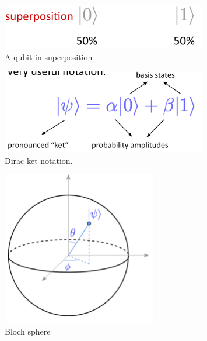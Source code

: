 \begin{figure}[H]
    \centering
    \includegraphics[width=0.8\textwidth]{lesson2/superposition_qubit.pdf}
    
        \caption{A qubit in superposition}
    
    \label{fig:superpos}
\end{figure}
\fi

\begin{figure}[H]
    \centering
    \includegraphics[width=0.8\textwidth]{lesson2/dirac_notation.pdf}
    
        \caption{Dirac ket notation. }
    
    \label{fig:ket-notation}
\end{figure}

\begin{figure}[H]
    \centering
    \includegraphics[width=0.6\textwidth]{lesson2/bloch_sphere.pdf}
    
        \caption{Bloch sphere}
    
    \label{fig:bloch}
\end{figure}


